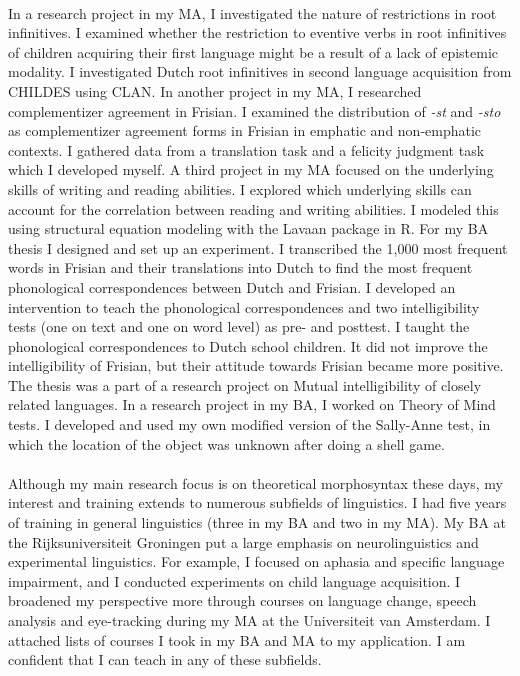 \documentclass[12pt]{article}
\begin{document}
\phantom{x}\\

In a research project in my MA, I investigated the nature of restrictions in root infinitives. I examined whether the restriction to eventive verbs in root infinitives of children acquiring their first language might be a result of a lack of epistemic modality. I investigated Dutch root infinitives in second language acquisition from CHILDES using CLAN. In another project in my MA, I researched complementizer agreement in Frisian. I examined the distribution of \emph{-st} and \emph{-sto} as complementizer agreement forms in Frisian in emphatic and non-emphatic contexts. I gathered data from a translation task and a felicity judgment task which I developed myself. A third project in my MA focused on the underlying skills of writing and reading abilities. I explored which underlying skills can account for the correlation between reading and writing abilities. I modeled this using structural equation modeling with the Lavaan package in R. For my BA thesis I designed and set up an experiment. I transcribed the 1,000 most frequent words in Frisian and their translations into Dutch to find the most frequent phonological correspondences between Dutch and Frisian. I developed an intervention to teach the phonological correspondences and two intelligibility tests (one on text and one on word level) as pre- and posttest. I taught the phonological correspondences to Dutch school children. It did not improve the intelligibility of Frisian, but their attitude towards Frisian became more positive. The thesis was a part of a research project on Mutual intelligibility of closely related languages. In a research project in my BA, I worked on Theory of Mind tests. I developed and used my own modified version of the Sally-Anne test, in which the location of the object was unknown after doing a shell game.\\

\phantom{x}\\

Although my main research focus is on theoretical morphosyntax these days, my interest and training extends to numerous subfields of linguistics. I had five years of training in general linguistics (three in my BA and two in my MA). My BA at the Rijksuniversiteit Groningen put a large emphasis on neurolinguistics and experimental linguistics. For example, I focused on aphasia and specific language impairment, and I conducted experiments on child language acquisition. I broadened my perspective more through courses on language change, speech analysis and eye-tracking during my MA at the Universiteit van Amsterdam. I attached lists of courses I took in my BA and MA to my application. I am confident that I can teach in any of these subfields.\\
\end{document}
